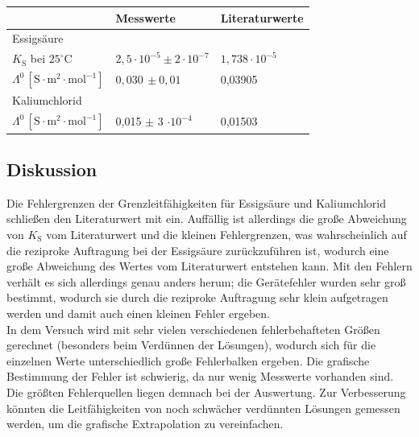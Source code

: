\documentclass[12pt,a4paper,titlepage,headinclude,bibtotoc]{scrartcl}
\begin{document}
\begin{table} [h]
\centering 
\begin{tabular}{p{3cm}|p{5cm}p{5cm}}
& Messwerte & Literaturwerte\\
\hline
Essigsäure & &\\
 $K_{\mathrm{S}}$  bei $25^\circ\text{C}$ & $2,5 \cdot 10^{-5} \pm 2 \cdot 10^{-7}$& $1,738 \cdot 10^{-5}$\\
$\mathit{\Lambda^0}\, [\mathrm{S} \cdot \mathrm{m^2} \cdot \mathrm{mol^{-1}}]$ & $ 0,030\, \pm 0,01 $& 0,03905\\
\hline
Kaliumchlorid & &\\
$\mathit{\Lambda^0}\, [\mathrm{S} \cdot \mathrm{m^2} \cdot \mathrm{mol^{-1}}]$ & 0,015 $\pm$ 3 $\cdot 10^{-4}$ & 0,01503\\
\end{tabular}
\end{table}



\subsection{Diskussion}

Die Fehlergrenzen der Grenzleitfähigkeiten für Essigsäure und Kaliumchlorid schließen den Literaturwert mit ein. Auffällig ist allerdings die große Abweichung von $K_\mathrm{S}$ vom Literaturwert und die kleinen Fehlergrenzen, was wahrscheinlich auf die reziproke Auftragung bei der Essigsäure zurückzuführen ist, wodurch eine große Abweichung des Wertes vom Literaturwert entstehen kann. Mit den Fehlern verhält es sich allerdings genau anders herum; die Gerätefehler wurden sehr groß bestimmt, wodurch sie durch die reziproke Auftragung sehr klein aufgetragen werden und damit auch einen kleinen Fehler ergeben.\\


In dem Versuch wird mit sehr vielen verschiedenen fehlerbehafteten Größen gerechnet (besonders beim Verdünnen der Lösungen), wodurch sich für die einzelnen Werte unterschiedlich große Fehlerbalken ergeben. Die grafische Bestimmung der Fehler ist schwierig, da nur wenig Messwerte vorhanden sind. \\

Die größten Fehlerquellen liegen demnach bei der Auswertung. Zur Verbesserung könnten die Leitfähigkeiten von noch schwächer verdünnten Lösungen gemessen werden, um die grafische Extrapolation zu vereinfachen.  \\
\end{document}
